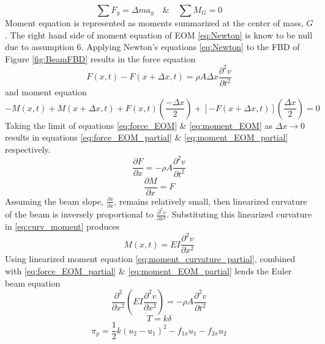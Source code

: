 \begin{equation} \label{eq:Newton}
\sum{F_y}=\Delta m a_y \quad \textrm{\&} \quad \sum{M_G}=0
\end{equation}
Moment equation is represented as moments summarized at the center of mass, $ G $. The right hand side of moment equation of EOM \eqref{eq:Newton} is know to be null due to assumption 6. Applying Newton's equations \eqref{eq:Newton} to the FBD of Figure \ref{fig:BeamFBD} results in the force equation
\begin{equation} \label{eq:force_EOM}
F(x,t)-F(x+\Delta x,t)=\rho A\Delta x \frac{\partial^2 v}{\partial t^2}
\end{equation}
and moment equation
\begin{equation} \label{eq:moment_EOM}
-M(x,t) + M(x+\Delta x,t) + F(x,t)\left( \frac{-\Delta x}{2}\right)  + \left[-F(x+\Delta x,t)\right] \left(\frac{\Delta x}{2}\right) = 0
\end{equation}
Taking the limit of equations \eqref{eq:force_EOM} \& \eqref{eq:moment_EOM} as $ \Delta x \rightarrow 0 $ results in equations \eqref{eq:force_EOM_partial} \& \eqref{eq:moment_EOM_partial} respectively.
\begin{equation} \label{eq:force_EOM_partial}
\frac{\partial F}{\partial x}=-\rho A \frac{\partial^2 v}{\partial t^2}
\end{equation} 
\begin{equation} \label{eq:moment_EOM_partial}
\frac{\partial M}{\partial x} = F
\end{equation}
Assuming the beam slope, $ \frac{\partial v}{\partial x} $, remains relatively small, then linearized curvature of the beam is inversely proportional to $ \frac{\partial^2 v}{\partial x^2} $. Substituting this linearized curvature in \eqref{eq:curv_moment} produces
\begin{equation} \label{eq:moment_curvature_partial}
M(x,t)=EI\frac{\partial^2 v}{\partial x^2}
\end{equation}
Using linearized moment equation \eqref{eq:moment_curvature_partial}, combined with \eqref{eq:force_EOM_partial} \&  \eqref{eq:moment_EOM_partial} lends the Euler beam equation
\begin{equation} \label{eq:euler_beam_equation}
\frac{\partial^2}{\partial x^2} \left(EI\frac{\partial^2 v}{\partial x^2}\right) = -\rho A\frac{\partial^2 v}{\partial t^2}
\end{equation}
\begin{equation} \label{eq:Hooke's_Law}
T=k\delta
\end{equation}
\begin{equation} \label{eq:Potential_energy_gov}
\pi_p=\frac{1}{2}k(u_2 -u_1)^2-f_{1x} u_1-f_{2x}u_2
\end{equation}

